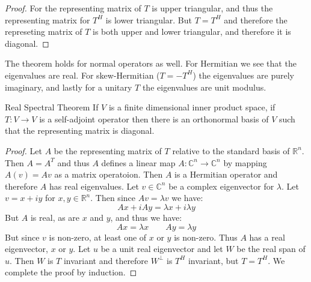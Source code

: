     \begin{proof}
        For the representing matrix of $T$ is upper triangular, and thus the
        representing matrix for $T^{H}$ is lower triangular. But $T=T^{H}$
        and therefore the represeting matrix of $T$ is both upper and lower
        triangular, and therefore it is diagonal.
    \end{proof}
    The theorem holds for normal operators as well. For Hermitian we see
    that the eigenvalues are real. For skew-Hermitian ($T=\minus{T}^{H}$)
    the eigenvalues are purely imaginary, and lastly for a unitary $T$ the
    eigenvalues are unit modulus.
    \begin{ftheorem}{Real Spectral Theorem}
        If $V$ is a finite dimensional inner product space, if
        $T:V\rightarrow{V}$ is a self-adjoint operator then there is an
        orthonormal basis of $V$ such that the representing matrix is
        diagonal.
    \end{ftheorem}
    \begin{proof}
        Let $A$ be the representing matrix of $T$ relative to the standard
        basis of $\mathbb{R}^{n}$. Then $A=A^{T}$ and thus $A$ defines a
        linear map $A:\mathbb{C}^{n}\rightarrow\mathbb{C}^{n}$ by mapping
        $A(v)=Av$ as a matrix operatoion. Then $A$ is a Hermitian operator
        and therefore $A$ has real eigenvalues. Let $v\in\mathbb{C}^{n}$ be
        a complex eigenvector for $\lambda$. Let $v=x+iy$ for
        $x,y\in\mathbb{R}^{n}$. Then since $Av=\lambda{v}$ we have:
        \begin{equation}
            Ax+iAy=\lambda{x}+i\lambda{y}
        \end{equation}
        But $A$ is real, as are $x$ and $y$, and thus we have:
        \begin{equation}
            Ax=\lambda{x}
            \quad\quad
            Ay=\lambda{y}
        \end{equation}
        But since $v$ is non-zero, at least one of $x$ or $y$ is non-zero.
        Thus $A$ has a real eigenvector, $x$ or $y$. Let $u$ be a unit
        real eigenvector and let $W$ be the real span of $u$. Then $W$ is
        $T$ invariant and therefore $W^{\perp}$ is $T^{H}$ invariant, but
        $T=T^{H}$. We complete the proof by induction.
    \end{proof}
